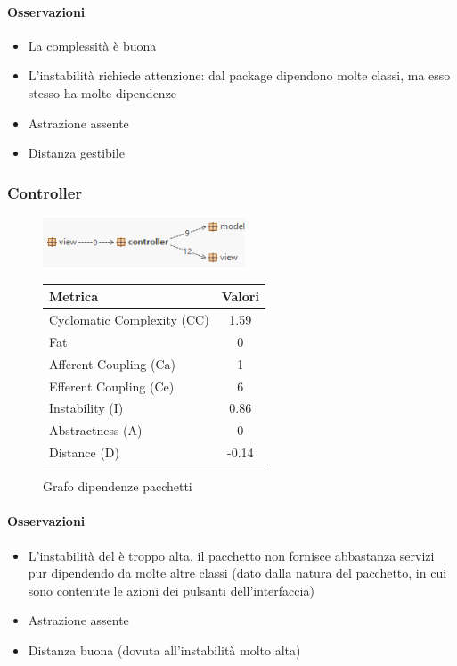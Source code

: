 \documentclass{article}
\begin{document}
\paragraph{Osservazioni}
\begin{itemize}
    \item La complessità è buona
    \item L'instabilità richiede attenzione: dal package dipendono molte classi, ma esso stesso ha molte dipendenze
    \item Astrazione assente
    \item Distanza gestibile 
\end{itemize}

\subsubsection{Controller}
\begin{figure}[H]
  \centering
  \begin{minipage}{0.4\textwidth}
    \centering
    \includegraphics[width=6cm]{imgs/coupling_controller.png}
    \caption{Grafo dipendenze pacchetti}
    \label{fig:enter-label}
  \end{minipage}
  \hfill
  \begin{minipage}{0.4\textwidth}
    \begin{tabular}{lc}
        \toprule
        \textbf{Metrica} & \textbf{Valori} \\
        \midrule
        Cyclomatic Complexity (CC) & \cellcolor{green}1.59 \\
        Fat & 0 \\
        Afferent Coupling (Ca) & 1 \\
        Efferent Coupling (Ce) & 6 \\
        Instability (I) & \cellcolor{red}0.86 \\
        Abstractness (A) &\cellcolor{red} 0 \\
        Distance (D) & \cellcolor{green}-0.14 \\
        \bottomrule
    \end{tabular}
  \end{minipage}
\end{figure}

\paragraph{Osservazioni}
\begin{itemize}
    \item L'instabilità del è troppo alta, il pacchetto non fornisce abbastanza servizi pur dipendendo da molte altre classi (dato dalla natura del pacchetto, in cui sono contenute le azioni dei pulsanti dell'interfaccia)
    \item Astrazione assente
    \item Distanza buona (dovuta all'instabilità molto alta)
\end{itemize}
\end{document}
